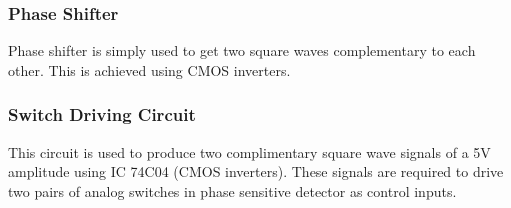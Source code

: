 \documentclass[12pt]{article}
\begin{document}
        \subsubsection{Phase Shifter}
            Phase shifter is simply used to get two square waves complementary to each other. This is achieved using CMOS inverters.
            
        \subsubsection{Switch Driving Circuit}
            This circuit is used to produce two complimentary square wave signals of a 5V amplitude using IC 74C04 (CMOS inverters). These signals are required to drive two pairs of analog switches in phase sensitive detector as control inputs.  
            
\end{document}

